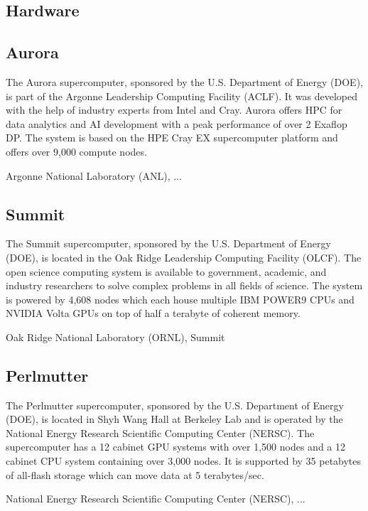 \documentclass[sigplan,screen]{acmart}
\begin{document}
\subsection{Hardware}

\subsection{Aurora}
\label{id:anl} 

The Aurora supercomputer, sponsored by the U.S. Department of Energy (DOE), is part of the Argonne Leadership Computing Facility (ACLF). It was developed with the help of industry experts from Intel and Cray. Aurora offers HPC for data analytics and AI development with a peak performance of over 2 Exaflop DP. The system is based on the HPE Cray EX supercomputer platform and offers over 9,000 compute nodes.

Argonne National Laboratory (ANL), ... \cite{www-aurora}

\subsection{Summit}
\label{id:ornl} 

The Summit supercomputer, sponsored by the U.S. Department of Energy (DOE), is located in the Oak Ridge Leadership Computing Facility (OLCF). The open science computing system is available to government, academic, and industry researchers to solve complex problems in all fields of science. The system is powered by 4,608 nodes which each house multiple IBM POWER9 CPUs and NVIDIA Volta GPUs on top of half a terabyte of coherent memory.

Oak Ridge National Laboratory (ORNL), Summit \cite{www-summit}


\subsection{Perlmutter}
\label{id:nersc} 

The Perlmutter supercomputer, sponsored by the U.S. Department of Energy (DOE), is located in Shyh Wang Hall at Berkeley Lab and is operated by the National Energy Research Scientific Computing Center (NERSC). The supercomputer has a 12 cabinet GPU systems with over 1,500 nodes and a 12 cabinet CPU system containing over 3,000 nodes. It is supported by 35 petabytes of all-flash storage which can move data at 5 terabytes/sec.

National Energy Research Scientific Computing Center (NERSC), ...
\cite{www-perlmutter}
\end{document}

